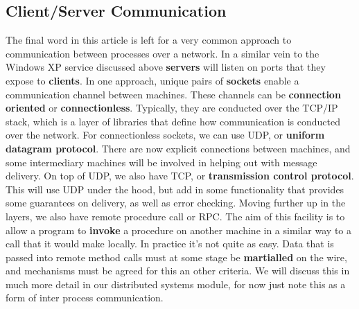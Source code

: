 \documentclass[10pt,a4paper]{article}
\begin{document}
\subsection{Client/Server Communication}
The final word in this article is left for a very common approach to communication between processes over a network. In a similar vein to the Windows XP service discussed above {\bf servers} will listen on ports that they expose to {\bf clients}. In one approach, unique pairs of {\bf sockets} enable a communication channel between machines. These channels can be {\bf connection oriented} or {\bf connectionless}. Typically, they are conducted over the TCP/IP stack, which is a layer of libraries that define how communication is conducted over the network. For connectionless sockets, we can use UDP, or {\bf uniform datagram protocol}. There are now explicit connections between machines, and some intermediary machines will be involved in helping out with message delivery. On top of UDP, we also have TCP, or {\bf transmission control protocol}. This will use UDP under the hood, but add in some functionality that provides some guarantees on delivery, as well as error checking.
\newline\newline
Moving further up in the layers, we also have {remote procedure call} or RPC. The aim of this facility is to allow a program to {\bf invoke} a procedure on another machine in a similar way to a call that it would make locally. In practice it's not quite as easy. Data that is passed into remote method calls must at some stage be {\bf martialled} on the wire, and mechanisms must be agreed for this an other criteria. 
\newline\newline
We will discuss this in much more detail in our distributed systems module, for now just note this as a form of inter process communication. 
{}

\begin{center}
\end{center}
\end{document}
